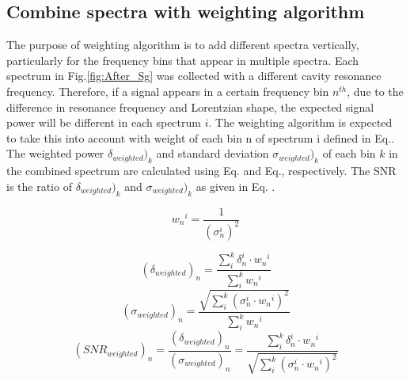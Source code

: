 \subsection{Combine spectra with weighting algorithm} \label{weighting_algorithm}

The purpose of weighting algorithm is to add different spectra vertically, particularly for the frequency bins that appear in multiple spectra.  Each spectrum in Fig.\ref{fig:After_Sg} was collected with a different cavity resonance frequency. Therefore, if a signal appears in a certain frequency bin $n^{th}$, due to the difference in resonance frequency and Lorentzian shape, the expected signal power will be different in each spectrum $i$. The weighting algorithm is expected to take this into account with weight of each bin n of spectrum i defined in Eq.\cite{eq:weight}. The weighted power $\delta_{weighted})_k$ and standard deviation $\sigma_{weighted})_k$ of each bin $k$ in the combined spectrum are calculated using Eq.\cite{eq:weighted_power} and Eq.\cite{eq:weighted_sigma}, respectively. The SNR is the ratio of $\delta_{weighted})_k$ and $\sigma_{weighted})_k$ as given in Eq. \cite{eq:weighted_SNR}.


\begin{equation}
    \label{eq:weight}
    {w_{n}}^{i} = \frac{1}{(\sigma_{n}^{i})^{2}}
\end{equation}


\begin{equation}
    \label{eq:weighted_power}
    (\delta_{weighted})_n = \frac{ \sum_{i}^{k}\delta_{n}^{i} \cdot {w_{n}}^{i}}{\sum_{i}^{k} {w_{n}}^{i}}
\end{equation}
\begin{equation}
    \label{eq:weighted_sigma}
    (\sigma_{weighted})_n = \frac{ \sqrt{\sum_{i}^{k}(\sigma_{n}^{i} \cdot {w_{n}}^{i})^2}}{\sum_{i}^{k} {w_{n}}^{i}}
\end{equation}
\begin{equation}
    \label{eq:weighted_SNR}
    ({SNR}_{weighted})_n = \frac{(\delta_{weighted})_n}{(\sigma_{weighted})_n}= \frac{\sum_{i}^{k}\delta_{n}^{i} \cdot {w_{n}}^{i}}{ \sqrt{\sum_{i}^{k}(\sigma_{n}^{i} \cdot {w_{n}}^{i})^2}}
\end{equation}


